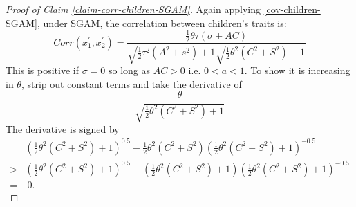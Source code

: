 \documentclass[
  12pt,
]{article}
\theoremstyle{definition}
\theoremstyle{definition}
\theoremstyle{definition}
\theoremstyle{definition}
\theoremstyle{remark}
\begin{document}
\begin{proof}[Proof of Claim \ref{claim-corr-children-SGAM}]

Again applying \eqref{cov-children-SGAM}, under SGAM, the correlation between 
children's traits is:
\[
Corr\left( x_{1}^{\prime },x_{2}^{\prime }\right) =\frac{\frac{1}{2}\theta
\tau \left( \sigma +AC\right) }{\sqrt{\frac{1}{2}\tau ^{2}\left(
A^{2}+s^{2}\right) +1}\sqrt{\frac{1}{2}\theta ^{2}\left( C^{2}+S^{2}\right)
+1}} 
\]
This is positive if $\sigma = 0$ so long as $AC > 0$ i.e. $0 < a < 1$. To show
it is increasing in $\theta$, strip out constant terms and take the derivative of
\[
\frac{\theta}{\sqrt{\frac{1}{2}\theta^2(C^2+S^2) + 1}}
\]
The derivative is signed by
\begin{align*}
& \left(\frac{1}{2}\theta^2(C^2+S^2) + 1\right)^{0.5} -
\frac{1}{2}\theta^2(C^2+S^2)\left(\frac{1}{2}\theta^2(C^2+S^2) + 1\right)^{-0.5} \\
>& \left(\frac{1}{2}\theta^2(C^2+S^2) + 1\right)^{0.5} - 
\left(\frac{1}{2}\theta^2(C^2+S^2)  + 1\right)\left(\frac{1}{2}\theta^2(C^2+S^2) + 1\right)^{-0.5} \\
=&\ 0.
\end{align*}
\end{proof}
\end{document}
